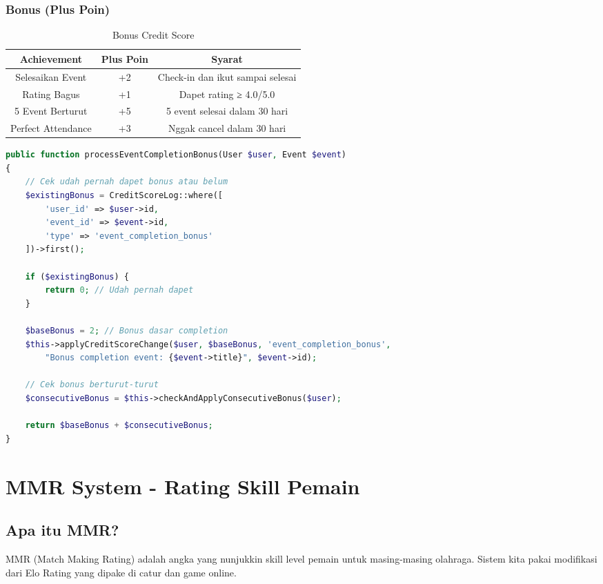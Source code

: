 \documentclass[12pt]{article}
\begin{document}
\subsubsection{Bonus (Plus Poin)}

\begin{table}[H]
\centering
\begin{tabular}{|c|c|c|}
\hline
\textbf{Achievement} & \textbf{Plus Poin} & \textbf{Syarat} \\
\hline
Selesaikan Event & +2 & Check-in dan ikut sampai selesai \\
Rating Bagus & +1 & Dapet rating ≥ 4.0/5.0 \\
5 Event Berturut & +5 & 5 event selesai dalam 30 hari \\
Perfect Attendance & +3 & Nggak cancel dalam 30 hari \\
\hline
\end{tabular}
\caption{Bonus Credit Score}
\end{table}

\begin{lstlisting}[language=PHP, caption=Bonus Event Completion]
public function processEventCompletionBonus(User $user, Event $event)
{
    // Cek udah pernah dapet bonus atau belum
    $existingBonus = CreditScoreLog::where([
        'user_id' => $user->id,
        'event_id' => $event->id,
        'type' => 'event_completion_bonus'
    ])->first();

    if ($existingBonus) {
        return 0; // Udah pernah dapet
    }

    $baseBonus = 2; // Bonus dasar completion
    $this->applyCreditScoreChange($user, $baseBonus, 'event_completion_bonus', 
        "Bonus completion event: {$event->title}", $event->id);

    // Cek bonus berturut-turut
    $consecutiveBonus = $this->checkAndApplyConsecutiveBonus($user);
    
    return $baseBonus + $consecutiveBonus;
}
\end{lstlisting}

\section{MMR System - Rating Skill Pemain}

\subsection{Apa itu MMR?}

MMR (Match Making Rating) adalah angka yang nunjukkin skill level pemain untuk masing-masing olahraga. Sistem kita pakai modifikasi dari Elo Rating yang dipake di catur dan game online.
\end{document}
